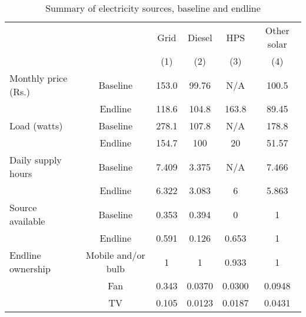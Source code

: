 \begin{table}[htbp]\centering
\caption{Summary of electricity sources, baseline and endline\label{tab:sourcestats}}
\begin{tabular}{l*{5}{c}}
\toprule
         &       &     Grid&   Diesel&      HPS&Other solar\\
         & & (1) & (2) &(3) & (4)\\
\midrule
Monthly price (Rs.)& Baseline &    153.0&    99.76&      N/A&    100.5\\
              
& Endline &    118.6&    104.8&    163.8&    89.45\\
 \addlinespace   

Load (watts)& Baseline &   278.1&    107.8&       N/A&    178.8\\
          

& Endline &    154.7&      100&       20&    51.57\\
   \addlinespace        

Daily supply hours& Baseline&   7.409&    3.375&        N/A&    7.466\\
              

& Endline &    6.322&    3.083&        6&    5.863\\
  \addlinespace       

Source available& Baseline&    0.353&    0.394&        0&        1\\
              

& Endline&    0.591&    0.126&    0.653&        1\\
    \addlinespace          

Endline ownership & Mobile and/or bulb&        1&        1&    0.933&        1\\
              

& Fan             &    0.343&   0.0370&   0.0300&   0.0948\\
               

& TV              &    0.105&   0.0123&   0.0187&   0.0431\\
            
\bottomrule
\end{tabular}
\end{table}
